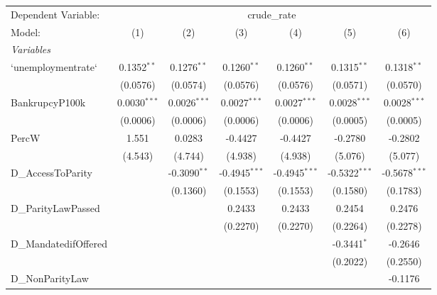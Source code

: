 \begingroup
\centering
\begin{tabular}{lcccccc}
   \tabularnewline \midrule \midrule
   Dependent Variable: & \multicolumn{6}{c}{crude\_rate}\\
   Model:                & (1)            & (2)            & (3)             & (4)             & (5)             & (6)\\  
   \midrule
   \emph{Variables}\\
   `unemploymentrate`    & 0.1352$^{**}$  & 0.1276$^{**}$  & 0.1260$^{**}$   & 0.1260$^{**}$   & 0.1315$^{**}$   & 0.1318$^{**}$\\   
                         & (0.0576)       & (0.0574)       & (0.0576)        & (0.0576)        & (0.0571)        & (0.0570)\\   
   BankrupcyP100k        & 0.0030$^{***}$ & 0.0026$^{***}$ & 0.0027$^{***}$  & 0.0027$^{***}$  & 0.0028$^{***}$  & 0.0028$^{***}$\\   
                         & (0.0006)       & (0.0006)       & (0.0006)        & (0.0006)        & (0.0005)        & (0.0005)\\   
   PercW                 & 1.551          & 0.0283         & -0.4427         & -0.4427         & -0.2780         & -0.2802\\   
                         & (4.543)        & (4.744)        & (4.938)         & (4.938)         & (5.076)         & (5.077)\\   
   D\_AccessToParity     &                & -0.3090$^{**}$ & -0.4945$^{***}$ & -0.4945$^{***}$ & -0.5322$^{***}$ & -0.5678$^{***}$\\   
                         &                & (0.1360)       & (0.1553)        & (0.1553)        & (0.1580)        & (0.1783)\\   
   D\_ParityLawPassed    &                &                & 0.2433          & 0.2433          & 0.2454          & 0.2476\\   
                         &                &                & (0.2270)        & (0.2270)        & (0.2264)        & (0.2278)\\   
   D\_MandatedifOffered  &                &                &                 &                 & -0.3441$^{*}$   & -0.2646\\   
                         &                &                &                 &                 & (0.2022)        & (0.2550)\\   
   D\_NonParityLaw       &                &                &                 &                 &                 & -0.1176\\   

\end{tabular}
